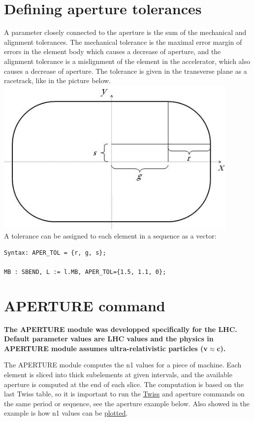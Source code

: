 \section{Defining aperture tolerances}
A parameter closely connected to the aperture is the sum of the
mechanical and alignment tolerances. The mechanical tolerance is the
maximal error margin of errors in the element body which causes a
decrease of aperture, and the alignment tolerance is a mislignment of
the element in the accelerator, which also causes a decrease of
aperture. The tolerance is given in the transverse plane as a racetrack,
like in the picture below. 
\\
\includegraphics[width=450px]{Introduction/tolerance.jpg}
\\ 
A tolerance can be assigned to each element in a \madx sequence as a vector: 
\begin{verbatim}
Syntax: APER_TOL = {r, g, s};

MB : SBEND, L := l.MB, APER_TOL={1.5, 1.1, 0};
\end{verbatim}

\section{APERTURE command}
{\bf The APERTURE module was developped specifically for the LHC.\\ 
Default parameter values are LHC values and the physics 
in APERTURE module assumes ultra-relativistic particles (v\(\approx\)c).} 

The APERTURE module computes the n1 values for a piece of machine. 
Each element is sliced into thick subelements at given intervals, and
the available aperture is computed at the end of each slice. 
The computation is based on the last Twiss table, so it is important to
run the 
\href{../twiss/twiss.html}{Twiss} and aperture commands on the same
period or sequence, see the aperture example below. Also showed in the
example is how n1 values can be \href{../plot/plot.html}{plotted}.   

